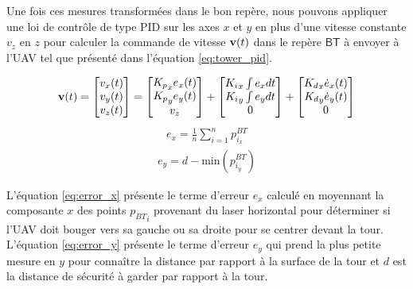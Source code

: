 Une fois ces mesures transformées dans le bon repère, nous pouvons appliquer une loi de contrôle de type PID sur les axes $x$ et $y$ en plus d'une vitesse constante $v_z$ en $z$ pour calculer la commande de vitesse $\mathbf{v}(t)$ dans le repère $\mathsf{BT}$ à envoyer à l'UAV tel que présenté dans l'équation \ref{eq:tower_pid}.

\begin{align}
  \mathbf{v}(t) = \begin{bmatrix}v_x(t)\\ v_y(t)\\ v_z(t)\end{bmatrix} =
  \begin{bmatrix}{K_p}_x e_x(t)\\ {K_p}_y e_y(t)\\ v_z\end{bmatrix} +
  \begin{bmatrix}{K_i}_x \int e_x dt\\ {K_i}_y \int e_y dt\\ 0\end{bmatrix} +
  \begin{bmatrix}{K_d}_x \dot{e}_x(t)\\ {K_d}_y \dot{e}_y(t)\\ 0\end{bmatrix}
  \label{eq:tower_pid}
\end{align}
\begin{align}
  e_x = \frac{1}{n} \sum_{i = 1}^n p^{BT}_{i_x}
  \label{eq:error_x}
\end{align}
\begin{align}
  e_y = d - {\text{min}}({p^{BT}_{i_y}})
  \label{eq:error_y}
\end{align}

L'équation \ref{eq:error_x} présente le terme d'erreur $e_x$ calculé en moyennant la composante $x$ des points ${p_{BT}}_i$ provenant du laser horizontal pour déterminer si l'UAV doit bouger vers sa gauche ou sa droite pour se centrer devant la tour. L'équation \ref{eq:error_y} présente le terme d'erreur $e_y$ qui prend la plus petite mesure en $y$ pour connaître la distance par rapport à la surface de la tour et $d$ est la distance de sécurité à garder par rapport à la tour.

